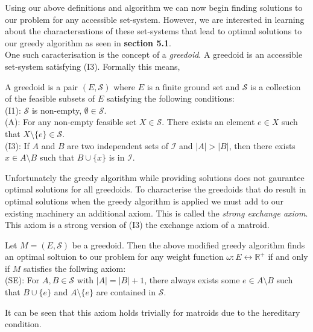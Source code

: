 \documentclass[../main.tex]{subfiles}
\begin{document}
\noindent Using our above definitions and algorithm we can now begin finding solutions to our problem for any accessible set-system. However, we are interested in learning about the charactersations of these set-systems that lead to optimal solutions to our greedy algorithm as seen in \textbf{section 5.1}.\\
One such caracterisation is the concept of a \textit{greedoid}. A greedoid is an accessible set-system satisfying (I3). Formally this means,
\begin{defn}
A greedoid is a pair $(E,\mathcal{S})$ where $E$ is a finite ground set and $\mathcal{S}$ is a collection of the feasible subsets of $E$ satisfying the following conditions:\\
(I1): $\mathcal{S}$ is non-empty, $\emptyset \in \mathcal{S}.$\\
(A):  For any non-empty feasible set $X \in \mathcal{S}.$ There exists an element $e \in X$ such that $X \setminus \{e\} \in \mathcal{S}.$\\
(I3): If $ A $ and $ B $ are two independent sets of $\mathcal{I}$ and $|A|>|B|$, then there exists $x \in A \setminus B$ such that $B \cup \{ x \}$ is in $\mathcal{I}.$
\end{defn}
Unfortunately the greedy algorithm while providing solutions does not gaurantee optimal solutions for all greedoids. To characterise the greedoids that do result in optimal solutions when the greedy algorithm is applied we must add to our existing machinery an additional axiom. This is called the \textit{strong exchange axiom}. This axiom is a strong version of (I3) the exchange axiom of a matroid. 
\begin{prop}
Let $M=(E,\mathcal{S})$ be a greedoid. Then the above modified greedy algorithm  finds an optimal soltuion to our problem for any weight function $\omega:E \longleftrightarrow \mathbb{R^+}$ if and only if $M$ satisfies the follwing axiom:\\
(SE): For $A,B \in \mathcal{S}$ with $|A|=|B|+1$, there always exists some $e \in A \setminus B$ such that $B \cup \{e\}$ and $A \setminus \{e\}$ are contained in $\mathcal{S}.$
\end{prop}
\begin{rem}
It can be seen that this axiom holds trivially for matroids due to the hereditary condition.
\end{rem}
\end{document}
